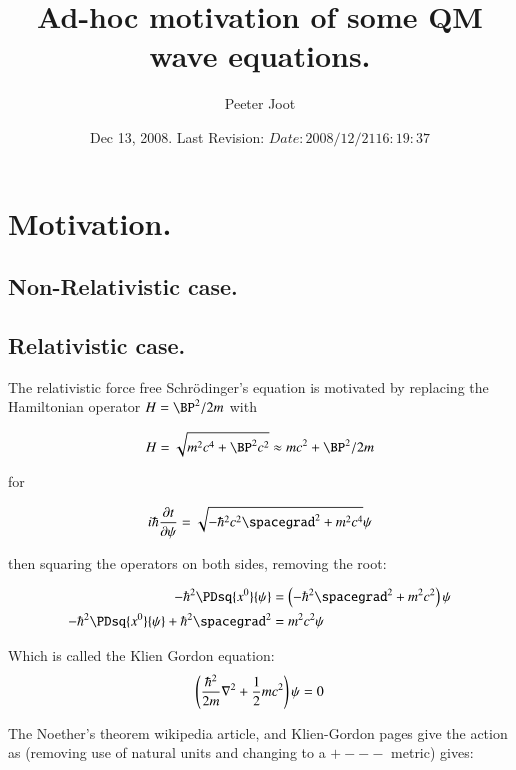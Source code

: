 \documentclass{article}
\title{ Ad-hoc motivation of some QM wave equations. }
\author{Peeter Joot}
\date{ Dec 13, 2008.  Last Revision: $Date: 2008/12/21 16:19:37 $ }
\begin{document}
\maketitle{}

\tableofcontents

\section{ Motivation. }

\subsection{ Non-Relativistic case. }

\subsection{ Relativistic case. }

The relativistic force free Schr\"{o}dinger's equation is motivated by \cite{srednicki2007qft} replacing the Hamiltonian operator $H = \BP^2/{2 m}$ with

\begin{align*}
H = \sqrt{m^2 c^4 + \BP^2 c^2} \approx m c^2 + \BP^2/2m
\end{align*}

for

\begin{align*}
i \hbar \PD{t}{\psi} = \sqrt{ -\hbar^2 c^2 \spacegrad^2 + m^2 c^4} \psi
\end{align*}

then squaring the operators on both sides, removing the root:

\begin{align*}
- \hbar^2 \PDsq{x^0}{\psi} &= \left(-\hbar^2 \spacegrad^2 + m^2 c^2 \right) \psi \\
- \hbar^2 \PDsq{x^0}{\psi} + \hbar^2 \spacegrad^2 &= m^2 c^2 \psi \\
\end{align*}

Which is called the Klien Gordon equation:
\begin{align*}
\left(\frac{\hbar^2}{2m} \nabla^2 + \frac{1}{2} m c^2\right) \psi = 0 \\
\end{align*}

The Noether's theorem wikipedia article, and Klien-Gordon pages give the action
as (removing use of natural units and changing to a $+---$ metric) gives:
\end{document}

